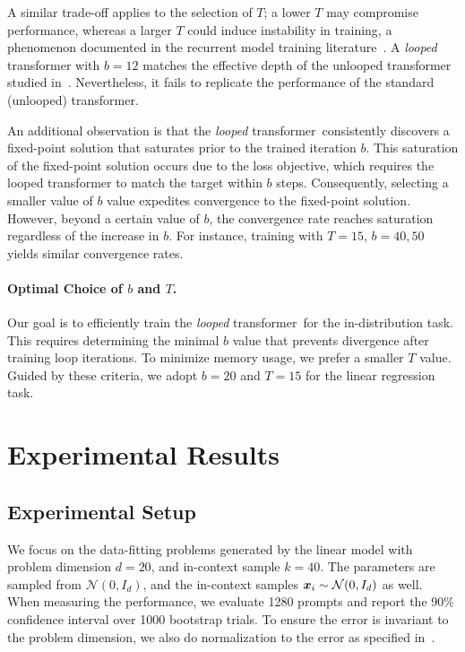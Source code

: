 \documentclass{article} %
\newcommand{\loopTF}{\emph{looped} transformer}
\theoremstyle{plain}
\theoremstyle{definition}
\theoremstyle{remark}
\begin{document}
A similar trade-off applies to the selection of $T$; a lower $T$ may compromise performance, whereas a larger $T$ could induce instability in training, a phenomenon documented in the recurrent model training literature~\citep{Jaeger2005ATO}. 
A \emph{looped} transformer with $b=12$ matches the effective depth of the unlooped transformer studied in~\citet{Garg2022WhatCT}. Nevertheless, it fails to replicate the performance of the standard (unlooped) transformer. 

An additional observation is that the \loopTF\ consistently discovers a fixed-point solution that saturates prior to the trained iteration $b$. This saturation of the fixed-point solution occurs due to the loss objective, which requires the looped transformer to match the target within $b$ steps. Consequently, selecting a smaller value of $b$ value expedites convergence to the fixed-point solution. However, beyond a certain value of $b$, the convergence rate reaches saturation regardless of the increase in $b$. For instance, training with $T=15$, $b=40, 50$ yields similar convergence rates.

\paragraph{Optimal Choice of $b$ and $T$.} Our goal is to efficiently train the \loopTF\ for the in-distribution task. This requires determining the minimal $b$ value that prevents divergence after training loop iterations. To minimize memory usage, we prefer a smaller $T$ value. Guided by these criteria, we adopt $b=20$ and $T=15$ for the linear regression task.

\section{Experimental Results}\label{sec:exp}
\subsection{Experimental Setup}\label{sec:exp_setup}
We focus on the data-fitting problems generated by the linear model with problem dimension $d=20$, and in-context sample $k=40$. The parameters are sampled from $\mathcal{N}(0, I_d)$, and the in-context samples ${\bm{x}}_i \sim \mathcal{N}(0, I_d)$ as well. When measuring the performance, we evaluate 1280 prompts and report the 90\% confidence interval over 1000 bootstrap trials. To ensure the error is invariant to the problem dimension, we also do normalization to the error as specified in~\citet{Garg2022WhatCT}.
\end{document}
